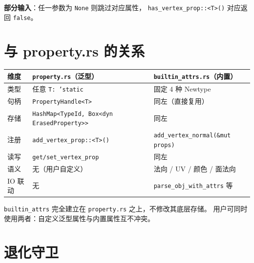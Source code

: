 \documentclass[11pt,a4paper]{article}
\begin{document}
\textbf{部分输入}：任一参数为 \texttt{None} 则跳过对应属性，
\texttt{has\_vertex\_prop::<T>()} 对应返回 \texttt{false}。

\section{与 property.rs 的关系}

\begin{center}
\renewcommand{\arraystretch}{1.18}
\begin{tabular}{@{}lll@{}}
  \toprule
  \textbf{维度} & \texttt{property.rs}（泛型） & \texttt{builtin\_attrs.rs}（内置） \\
  \midrule
  类型      & 任意 \texttt{T: 'static}              & 固定 4 种 Newtype \\
  句柄      & \texttt{PropertyHandle<T>}            & 同左（直接复用） \\
  存储      & \texttt{HashMap<TypeId, Box<dyn ErasedProperty>>} & 同左 \\
  注册      & \texttt{add\_vertex\_prop::<T>()}     & \texttt{add\_vertex\_normal(\&mut props)} \\
  读写      & \texttt{get/set\_vertex\_prop}        & 同左 \\
  语义      & 无（用户自定义）                       & 法向 / UV / 颜色 / 面法向 \\
  IO 联动   & 无                                    & \texttt{parse\_obj\_with\_attrs} 等 \\
  \bottomrule
\end{tabular}
\end{center}

\texttt{builtin\_attrs} 完全建立在 \texttt{property.rs} 之上，不修改其底层存储。
用户可同时使用两者：自定义泛型属性与内置属性互不冲突。

\section{退化守卫}
\end{document}
